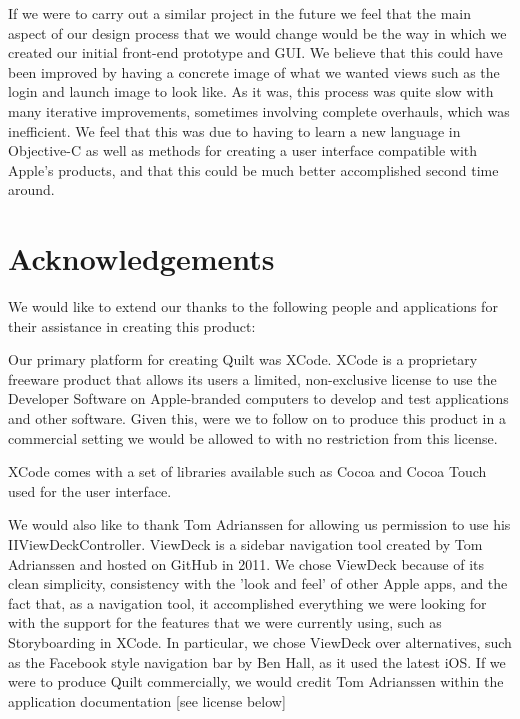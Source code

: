 \documentclass[a4wide, 10pt]{article}
\begin{document}
If we were to carry out a similar project in the future we feel that the main aspect of our design process that we would change would be the way in which we created our initial front-end prototype and GUI. We believe that this could have been improved by having a concrete image of what we wanted views such as the login and launch image to look like. As it was, this process was quite slow with many iterative improvements, sometimes involving complete overhauls, which was inefficient. We feel that this was due to having to learn a new language in Objective-C as well as methods for creating a user interface compatible with Apple's products, and that this could be much better accomplished second time around. 
	
\section{Acknowledgements}

We would like to extend our thanks to the following people and applications for their assistance in creating this product:

Our primary platform for creating Quilt was XCode. XCode is a proprietary freeware product that allows its users a limited, non-exclusive license to use the Developer Software on Apple-branded computers to develop and test applications and other software. Given this, were we to follow on to produce this product in a commercial setting we would be allowed to with no restriction from this license.

XCode comes with a set of libraries available such as Cocoa and Cocoa Touch used for the user interface. 



We would also like to thank Tom Adrianssen for allowing us permission to use his IIViewDeckController. ViewDeck is a sidebar navigation tool created by Tom Adrianssen and hosted on GitHub in 2011. We chose ViewDeck because of its clean simplicity, consistency with the 'look and feel' of other Apple apps, and the fact that, as a navigation tool, it accomplished everything we were looking for with the support for the features that we were currently using, such as Storyboarding in XCode. In particular, we chose ViewDeck over alternatives, such as the Facebook style navigation bar by Ben Hall, as it used the latest iOS. If we were to produce Quilt commercially, we would credit Tom Adrianssen within the application documentation [see license below]
\end{document}
